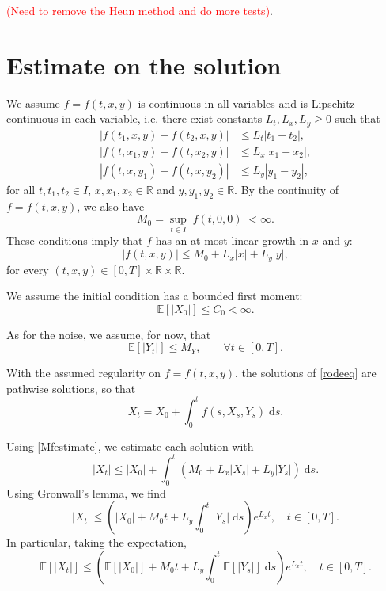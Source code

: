 \documentclass[reqno,12pt]{amsart}
\theoremstyle{plain}%
\theoremstyle{definition}
\begin{document}
\textcolor{red}{(Need to remove the Heun method and do more tests)}.

\section{Estimate on the solution}

We assume $f=f(t, x, y)$ is continuous in all variables and is Lipschitz continuous in each variable, i.e. there exist constants $L_t, L_x, L_y \geq 0$ such that
\begin{align}
  |f(t_1, x, y) - f(t_2, x, y)| & \leq L_t |t_1-t_2|, \\
  |f(t, x_1, y) - f(t, x_2, y)| & \leq L_x |x_1 - x_2|, \\
  |f(t, x, y_1) - f(t, x, y_2)| & \leq L_y |y_1 - y_2|,
\end{align}
for all $t, t_1, t_2 \in I$, $x, x_1, x_2 \in \mathbb{R}$ and $y, y_1, y_2\in \mathbb{R}$. By the continuity of $f=f(t, x, y)$, we also have
$$
M_0 = \sup_{t\in I} |f(t, 0, 0)| < \infty.
$$
These conditions imply that $f$ has an at most linear growth in $x$ and $y$:
\begin{equation}
    \label{Mfestimate}
    |f(t, x, y)| \leq M_0 + L_x|x| + L_y|y|,
\end{equation}
for every $(t, x, y) \in [0, T] \times \mathbb{R} \times \mathbb{R}$.

We assume the initial condition has a bounded first moment:
\begin{equation}
    \label{EX0assumption}
    \mathbb{E}[|X_0|] \leq C_0 < \infty.
\end{equation}

As for the noise, we assume, for now, that
\begin{equation}
    \label{EYtassumption}
    \mathbb{E}[|Y_t|] \leq M_Y, \qquad \forall t\in [0, T].
\end{equation}

With the assumed regularity on $f=f(t, x, y)$, the solutions of \eqref{rodeeq} are pathwise solutions, so that
$$
X_t = X_0 + \int_0^t f(s, X_s, Y_s) \;\mathrm{d}s.
$$

Using \eqref{Mfestimate}, we estimate each solution with
$$
    |X_t|  \leq |X_0| + \int_0^t (M_0 + L_x |X_s| + L_y |Y_s|) \;\mathrm{d}s.
$$
Using Gronwall's lemma, we find
\begin{equation}
    \label{Xtestimate}
    |X_t| \leq \left( |X_0| + M_0 t  + L_y \int_0^t |Y_s| \;\mathrm{d}s\right) e^{L_x t}, \quad t \in [0, T].
\end{equation}
In particular, taking the expectation, 
$$
    \mathbb{E}[|X_t|] \leq \left( \mathbb{E}[|X_0|] + M_0 t  + L_y \int_0^t \mathbb{E}[|Y_s|] \;\mathrm{d}s\right) e^{L_x t}, \quad t \in [0, T].
$$
\end{document}
